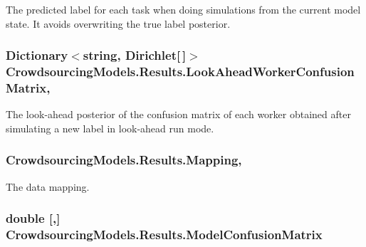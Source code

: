The predicted label for each task when doing simulations from the current model state. It avoids overwriting the true label posterior. 

\hypertarget{class_crowdsourcing_models_1_1_results_a8c9bb0c3660f32404b453c169bb4e2e3}{}
\subsubsection[{Look\+Ahead\+Worker\+Confusion\+Matrix}]{\setlength{\rightskip}{0pt plus 5cm}Dictionary$<$string, Dirichlet\mbox{[}$\,$\mbox{]}$>$ Crowdsourcing\+Models.\+Results.\+Look\+Ahead\+Worker\+Confusion\+Matrix\hspace{0.3cm}{\ttfamily [get]}, {}}\label{class_crowdsourcing_models_1_1_results_a8c9bb0c3660f32404b453c169bb4e2e3}


The look-\/ahead posterior of the confusion matrix of each worker obtained after simulating a new label in look-\/ahead run mode. 

\hypertarget{class_crowdsourcing_models_1_1_results_ad5b164d844e8bace19604f8cf056e4fe}{}
\subsubsection[{Mapping}]{ Crowdsourcing\+Models.\+Results.\+Mapping\hspace{0.3cm}{\ttfamily [get]}, {\ttfamily [set]}}\label{class_crowdsourcing_models_1_1_results_ad5b164d844e8bace19604f8cf056e4fe}


The data mapping. 

\hypertarget{class_crowdsourcing_models_1_1_results_a3743219650ac6c051e146aa6c628da13}{}
\subsubsection[{Model\+Confusion\+Matrix}]{\setlength{\rightskip}{0pt plus 5cm}double \mbox{[},\mbox{]} Crowdsourcing\+Models.\+Results.\+Model\+Confusion\+Matrix\hspace{0.3cm}{\ttfamily [get]}}\label{class_crowdsourcing_models_1_1_results_a3743219650ac6c051e146aa6c628da13}


